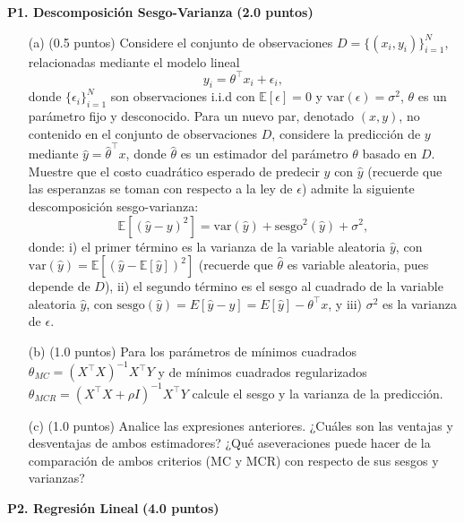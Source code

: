 \documentclass[11pt,letterpaper]{article}
\begin{document}
\noindent\textbf{P1. Descomposición Sesgo-Varianza} \textbf{(2.0 puntos)}
\vspace{5 mm}
\begin{itemize}
    \item[(a)] (0.5 puntos) Considere el conjunto de  observaciones  $D=\{(x_{i}, y_{i})\}_{i=1}^{N}$, relacionadas mediante el modelo lineal  
    	\begin{equation*}
    	    y_{i}=\theta^\top x_{i}+\epsilon_{i},
    	\end{equation*}
    	 donde $\{\epsilon_{i}\}_{i=1}^N$ son observaciones i.i.d con $\mathbb{E}[\epsilon]=0$ y $\text{var}(\epsilon)=\sigma^{2}$,  $\theta$ es un parámetro fijo y desconocido. Para un nuevo par, denotado $(x,y)$, no contenido en el conjunto de observaciones $D$, considere la predicción de $y$ mediante $\hat y=\hat\theta^\top x$, donde $\hat{\theta}$ es un estimador del  parámetro $\theta$ basado en $D$. Muestre que el costo cuadrático esperado de predecir $y$  con $\hat y$ (recuerde que las esperanzas se toman con   respecto a la ley de $\epsilon$) admite la siguiente  descomposición sesgo-varianza:
    	\begin{equation*}
    	    \mathbb{E}\left[(\hat{y}-y)^{2}\right] = \text{var}(\hat{y})+\text{sesgo}^{2}(\hat{y}) + \sigma^{2},
    	\end{equation*}
        donde: i) el primer término es la varianza de la variable aleatoria $\hat y$, con $\text{var}(\hat{y})=\mathbb{E}\left[(\hat{y}-\mathbb{E}[\hat{y}])^{2}\right]$ (recuerde que $\hat\theta$ es variable aleatoria, pues depende de $D$), ii) el segundo término es el sesgo al cuadrado de la variable aleatoria $\hat{y}$, con $\text{sesgo}(\hat{y})=E\left[\hat{y}-y\right]=E\left[\hat{y}\right]- \theta^\top x$, y  iii) $\sigma^2$ es la varianza de $\epsilon$.
	\item[(b)] (1.0 puntos) Para los parámetros de mínimos cuadrados $\theta_{MC} = (X^\top X) ^{-1}X^\top Y $  y de  mínimos cuadrados regularizados $\theta_{MCR} = (X^\top X + \rho I) ^{-1}X^\top Y$ calcule el sesgo y la varianza de la predicción.
	\item[(c)] (1.0 puntos) Analice las expresiones anteriores. ¿Cuáles son las ventajas y desventajas de ambos estimadores? ¿Qué aseveraciones  puede hacer de la comparación de ambos criterios (MC y MCR) con respecto de  sus  sesgos y  varianzas?
	
\end{itemize}

\vspace{5 mm}
\noindent\textbf{P2. Regresión Lineal} \textbf{(4.0 puntos)}
\vspace{5 mm}
\end{document}
